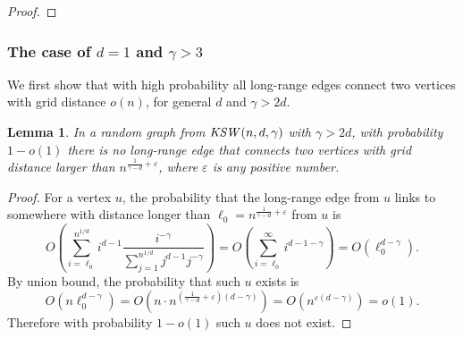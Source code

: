 \documentclass[11pt]{article}
\newtheorem{lem}{Lemma}
\def\KSW{{\it KSW }}
\begin{document}
\begin{proof}
%
\end{proof}


\subsubsection{The case of $d=1$ and $\gamma > 3$} \label{sec:1dlarger}

We first show that with high probability all long-range edges connect
	two vertices with grid distance $o(n)$, for general $d$ and $\gamma>2d$.

\begin{lem} \label{lemma:shortedge}
In a random graph from $\KSW(n,d,\gamma)$ with $\gamma>2d$,	
	with probability $1-o(1)$
	there is no long-range edge that
	connects two vertices with grid distance
	larger than $n^{\frac{1}{\gamma-d}+\varepsilon}$, where $\varepsilon$ is any positive number.
\end{lem}

\begin{proof}
For a vertex $u$, the probability that the long-range edge from $u$ links to somewhere with distance longer than 
	$\ell_0=n^{\frac{1}{\gamma-d}+\varepsilon}$ from $u$ is 
\[O\left(\sum_{i=\ell_0}^{n^{1/d}}i^{d-1}\frac{i^{-\gamma}}{\sum_{j=1}^{n^{1/d}}j^{d-1}j^{-\gamma}}\right)=O\left(\sum_{i=\ell_0}^\infty i^{d-1-\gamma}\right)=O\left(\ell_0^{d-\gamma}\right).\] By union bound, the probability that such $u$ exists is 
\[O\left(n\ell_0^{d-\gamma}\right)=O\left(n\cdot n^{(\frac{1}{\gamma-d}+\varepsilon)(d-\gamma)}\right)=O\left(n^{\varepsilon(d-\gamma)}\right)=o(1).\] 
Therefore with probability $1-o(1)$ such $u$ does not exist.
\end{proof}
\end{document}
